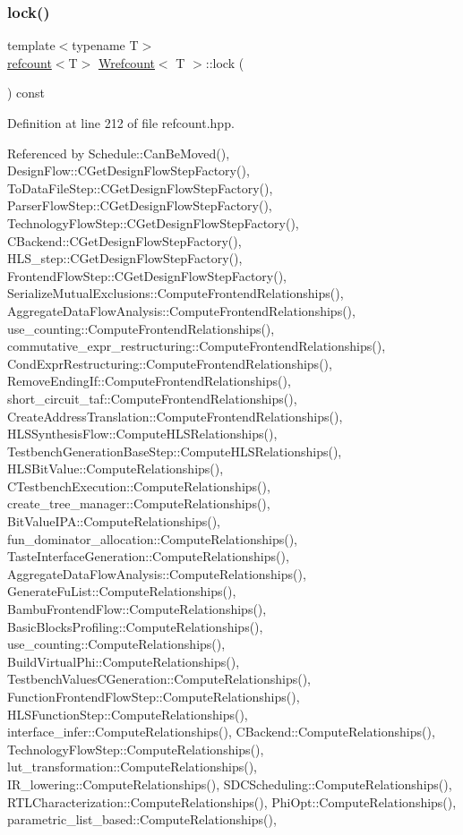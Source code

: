 \subsubsection{\texorpdfstring{lock()}{lock()}}
{\footnotesize\ttfamily template$<$typename T$>$ \\
\hyperlink{structrefcount}{refcount}$<$T$>$ \hyperlink{classWrefcount}{Wrefcount}$<$ T $>$\+::lock (\begin{DoxyParamCaption}{ }\end{DoxyParamCaption}) const\hspace{0.3cm}{\ttfamily [inline]}}



Definition at line 212 of file refcount.\+hpp.



Referenced by Schedule\+::\+Can\+Be\+Moved(), Design\+Flow\+::\+C\+Get\+Design\+Flow\+Step\+Factory(), To\+Data\+File\+Step\+::\+C\+Get\+Design\+Flow\+Step\+Factory(), Parser\+Flow\+Step\+::\+C\+Get\+Design\+Flow\+Step\+Factory(), Technology\+Flow\+Step\+::\+C\+Get\+Design\+Flow\+Step\+Factory(), C\+Backend\+::\+C\+Get\+Design\+Flow\+Step\+Factory(), H\+L\+S\+\_\+step\+::\+C\+Get\+Design\+Flow\+Step\+Factory(), Frontend\+Flow\+Step\+::\+C\+Get\+Design\+Flow\+Step\+Factory(), Serialize\+Mutual\+Exclusions\+::\+Compute\+Frontend\+Relationships(), Aggregate\+Data\+Flow\+Analysis\+::\+Compute\+Frontend\+Relationships(), use\+\_\+counting\+::\+Compute\+Frontend\+Relationships(), commutative\+\_\+expr\+\_\+restructuring\+::\+Compute\+Frontend\+Relationships(), Cond\+Expr\+Restructuring\+::\+Compute\+Frontend\+Relationships(), Remove\+Ending\+If\+::\+Compute\+Frontend\+Relationships(), short\+\_\+circuit\+\_\+taf\+::\+Compute\+Frontend\+Relationships(), Create\+Address\+Translation\+::\+Compute\+Frontend\+Relationships(), H\+L\+S\+Synthesis\+Flow\+::\+Compute\+H\+L\+S\+Relationships(), Testbench\+Generation\+Base\+Step\+::\+Compute\+H\+L\+S\+Relationships(), H\+L\+S\+Bit\+Value\+::\+Compute\+Relationships(), C\+Testbench\+Execution\+::\+Compute\+Relationships(), create\+\_\+tree\+\_\+manager\+::\+Compute\+Relationships(), Bit\+Value\+I\+P\+A\+::\+Compute\+Relationships(), fun\+\_\+dominator\+\_\+allocation\+::\+Compute\+Relationships(), Taste\+Interface\+Generation\+::\+Compute\+Relationships(), Aggregate\+Data\+Flow\+Analysis\+::\+Compute\+Relationships(), Generate\+Fu\+List\+::\+Compute\+Relationships(), Bambu\+Frontend\+Flow\+::\+Compute\+Relationships(), Basic\+Blocks\+Profiling\+::\+Compute\+Relationships(), use\+\_\+counting\+::\+Compute\+Relationships(), Build\+Virtual\+Phi\+::\+Compute\+Relationships(), Testbench\+Values\+C\+Generation\+::\+Compute\+Relationships(), Function\+Frontend\+Flow\+Step\+::\+Compute\+Relationships(), H\+L\+S\+Function\+Step\+::\+Compute\+Relationships(), interface\+\_\+infer\+::\+Compute\+Relationships(), C\+Backend\+::\+Compute\+Relationships(), Technology\+Flow\+Step\+::\+Compute\+Relationships(), lut\+\_\+transformation\+::\+Compute\+Relationships(), I\+R\+\_\+lowering\+::\+Compute\+Relationships(), S\+D\+C\+Scheduling\+::\+Compute\+Relationships(), R\+T\+L\+Characterization\+::\+Compute\+Relationships(), Phi\+Opt\+::\+Compute\+Relationships(), parametric\+\_\+list\+\_\+based\+::\+Compute\+Relationships(), 